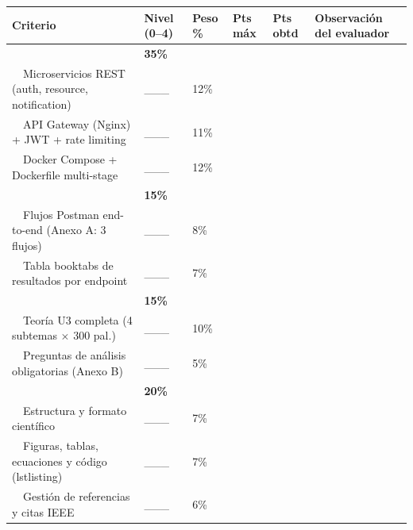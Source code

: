 \documentclass[11pt,a4paper,landscape]{article}
\begin{document}
	\begin{center}
		\small
		\setlength{\extrarowheight}{6pt}
		\begin{tabular}{|P{9.5cm}|C{1.8cm}|C{1.5cm}|C{1.5cm}|C{1.5cm}|P{7.5cm}|}
			\hline
			\color{white}\textbf{Criterio} & \color{white}\textbf{Nivel (0--4)} & \color{white}\textbf{Peso \%} & \color{white}\textbf{Pts m\'ax} & \color{white}\textbf{Pts obtd} & \color{white}\textbf{Observaci\'on del evaluador}\\
			\hline
			
			 & \textbf{35\%} & & &\\
			\hline
			\ \ Microservicios REST (auth, resource, notification) & \_\_\_ & 12\% & & &\\
			\hline
			\ \ API Gateway (Nginx) + JWT + rate limiting & \_\_\_ & 11\% & & &\\
			\hline
			\ \ Docker Compose + Dockerfile multi-stage & \_\_\_ & 12\% & & &\\
			\hline
			
			 & \textbf{15\%} & & &\\
			\hline
			\ \ Flujos Postman end-to-end (Anexo A: 3 flujos) & \_\_\_ & 8\% & & &\\
			\hline
			\ \ Tabla booktabs de resultados por endpoint & \_\_\_ & 7\% & & &\\
			\hline
			
			 & \textbf{15\%} & & &\\
			\hline
			\ \ Teor\'ia U3 completa (4 subtemas $\times$ 300 pal.) & \_\_\_ & 10\% & & &\\
			\hline
			\ \ Preguntas de an\'alisis obligatorias (Anexo B) & \_\_\_ & 5\% & & &\\
			\hline
			
			 & \textbf{20\%} & & &\\
			\hline
			\ \ Estructura y formato cient\'ifico & \_\_\_ & 7\% & & &\\
			\hline
			\ \ Figuras, tablas, ecuaciones y c\'odigo (lstlisting) & \_\_\_ & 7\% & & &\\
			\hline
			\ \ Gesti\'on de referencias y citas IEEE & \_\_\_ & 6\% & & &\\
			\hline
			

\end{tabular}
\end{center}
\end{document}

